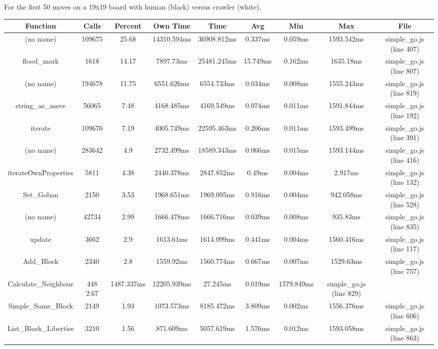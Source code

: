 \documentclass{memoir}
\begin{document}
For the first 50 moves on a 19x19 board with human (black) versus crawler (white),
\begin{tabular}{ccccccccc}
\hline
Function & Calls & Percent & Own Time & Time & Avg & Min & Max & File\\
\hline
(no name) & 109675 & 25.68 & 14310.594ms &	36908.812ms &	0.337ms &	0.059ms	& 1593.542ms	& simple\_go.js (line 407)\\
\hline
flood\_mark & 1618 & 14.17 & 7897.73ms & 25481.245ms & 15.749ms & 0.162ms & 1635.18ms & simple\_go.js (line 807)\\
\hline
(no name) &	194678 &	11.75	& 6551.626ms &	6554.733ms &	0.034ms &	0.008ms &	1555.243ms &	simple\_go.js (line 819)\\
\hline
string\_as\_move &	56065 &	7.48 &	4168.485ms &	4169.549ms &	0.074ms &	0.011ms &	1591.844ms &	simple\_go.js (line 192)\\
\hline
iterate	& 109676 &	7.19 &	4005.749ms &	22595.463ms &	0.206ms &	0.011ms &	1593.499ms &	simple\_go.js (line 391)\\
\hline
(no name) &	283642 &	4.9 &	2732.499ms &	18589.343ms &	0.066ms &	0.015ms &	1593.144ms &	simple\_go.js (line 416)\\
\hline
iterateOwnProperties &	5811	& 4.38	& 2440.378ms &	2847.852ms &	0.49ms &	0.004ms &	2.917ms &	simple\_go.js (line 132)\\
\hline
Set\_Goban &	2150 &	3.53 &	1968.651ms &	1969.095ms &	0.916ms &	0.004ms &	942.058ms &	simple\_go.js (line 528)\\
\hline
(no name) &	42734 &	2.99 &	1666.478ms &	1666.716ms &	0.039ms &	0.008ms &	935.83ms &	simple\_go.js (line 835)\\
\hline
update &	3662 &	2.9 &	1613.61ms &	1614.099ms &	0.441ms &	0.004ms &	1560.416ms &	simple\_go.js (line 117)\\
\hline
Add\_Block &	2340 &	2.8 &	1559.92ms &	1560.774ms &	0.667ms &	0.007ms &	1529.63ms &	simple\_go.js (line 757)\\
\hline
Calculate\_Neighbour &	448	2.67 &	1487.337ms &	12205.939ms &	27.245ms &	0.019ms &	1579.849ms &	simple\_go.js (line 829)\\
\hline
Simple\_Same\_Block &	2149 &	1.93 &	1073.573ms &	8185.472ms &	3.809ms &	0.002ms &	1556.376ms &	simple\_go.js (line 606)\\
\hline
List\_Block\_Liberties &	3210 &	1.56 &	871.609ms &	5057.619ms &	1.576ms &	0.012ms &	1593.058ms &	simple\_go.js (line 863)\\
\hline
\end{tabular}
\end{document}
